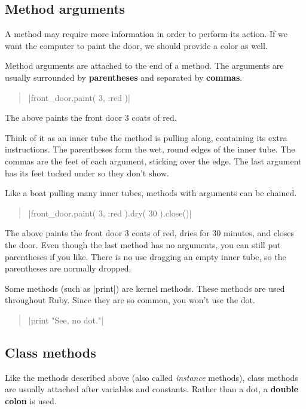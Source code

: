 \documentclass[12pt,twoside]{report}
\begin{document}
\subsection{Method arguments}



A method may require more information in order to perform its action.
If we want the computer to paint the door, we should provide a color
as well.

Method arguments are attached to the end of a method.  The arguments
are usually surrounded by {\bf parentheses} and separated by {\bf
  commas}.

\begin{quote}
\rubyinline|front_door.paint( 3, :red )|\end{quote}


The above paints the front door 3 coats of red.

Think of it as an inner tube the method is pulling along, containing
its extra instructions. The parentheses form the wet, round edges of
the inner tube.  The commas are the feet of each argument, sticking
over the edge.  The last argument has its feet tucked under so they
don't show.

Like a boat pulling many inner tubes, methods with arguments can be
chained.

\begin{quote}
\rubyinline|front_door.paint( 3, :red ).dry( 30 ).close()|\end{quote}

The above paints the front door 3 coats of red, dries for 30 minutes,
and closes the door.  Even though the last method has no arguments,
you can still put parentheses if you like.  There is no use dragging
an empty inner tube, so the parentheses are normally dropped.

Some methods (such as \rubyinline|print|) are kernel
methods.  These methods are used throughout Ruby.  Since they are so
common, you won't use the dot.

\begin{quote}
\rubyinline|print "See, no dot."|\end{quote}




\subsection{Class methods}



Like the methods described above (also called {\em instance} methods),
class methods are usually attached after variables and constants.
Rather than a dot, a {\bf double colon} is used.
\end{document}
